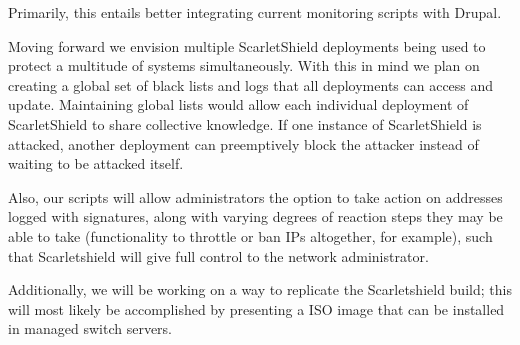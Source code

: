 \documentclass[12pt,letterpaper,titlepage]{report}
\begin{document}
{Primarily, this entails better integrating current monitoring scripts with
Drupal.

Moving forward we envision multiple ScarletShield deployments being used to
protect a multitude of systems simultaneously.  With this in mind we plan on
creating a global set of black lists and logs that all deployments can
access and update.  Maintaining global lists would allow each individual
deployment of ScarletShield to share collective knowledge. If one instance
of ScarletShield is attacked, another deployment can preemptively block the
attacker instead of waiting to be attacked itself.

Also, our scripts will allow administrators the option to take action on
addresses logged with signatures, along with varying degrees of reaction
steps they may be able to take (functionality to throttle or ban IPs
altogether, for example), such that Scarletshield will give full control to
the network administrator.

Additionally, we will be working on a way to replicate the Scarletshield
build; this will most likely be accomplished by presenting a ISO image that
can be installed in managed switch servers.


}
\printbibliography
\end{document}
